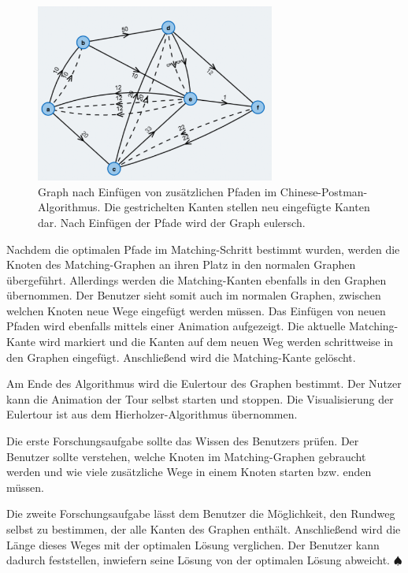 \begin{figure}[h!]
	\centering
	\includegraphics[width=0.70\textwidth]{figures/postman_eulerian}
	\caption[Chinese-Postman: Eulerscher Graph]{Graph nach Einfügen von zusätzlichen Pfaden im Chinese-Postman-Algorithmus. Die gestrichelten Kanten stellen neu eingefügte Kanten dar. Nach Einfügen der Pfade wird der Graph eulersch.}\label{fig:postman_eulerian}
\end{figure}

Nachdem die optimalen Pfade im Matching-Schritt bestimmt wurden, werden die Knoten des Matching-Graphen an ihren Platz in den normalen Graphen übergeführt. Allerdings werden die Matching-Kanten ebenfalls in den Graphen übernommen. Der Benutzer sieht somit auch im normalen Graphen, zwischen welchen Knoten neue Wege eingefügt werden müssen.
Das Einfügen von neuen Pfaden wird ebenfalls mittels einer Animation aufgezeigt. Die aktuelle Matching-Kante wird markiert und die Kanten auf dem neuen Weg werden schrittweise in den Graphen eingefügt. Anschließend wird die Matching-Kante gelöscht.

Am Ende des Algorithmus wird die Eulertour des Graphen bestimmt. Der Nutzer kann die Animation der Tour selbst starten und stoppen. Die Visualisierung der Eulertour ist aus dem Hierholzer-Algorithmus übernommen.

Die erste Forschungsaufgabe sollte das Wissen des Benutzers prüfen. Der Benutzer sollte verstehen, welche Knoten im Matching-Graphen gebraucht werden und wie viele zusätzliche Wege in einem Knoten starten bzw. enden müssen.

Die zweite Forschungsaufgabe lässt dem Benutzer die Möglichkeit, den Rundweg selbst zu bestimmen, der alle Kanten des Graphen enthält. Anschließend wird die Länge dieses Weges mit der optimalen Lösung verglichen. Der Benutzer kann dadurch feststellen, inwiefern seine Lösung von der optimalen Lösung abweicht. \hfill$\spadesuit$

